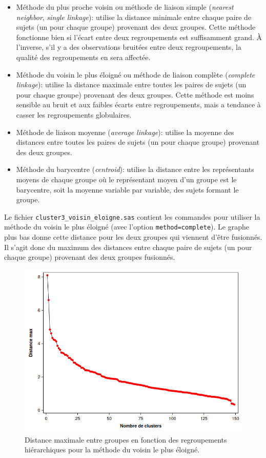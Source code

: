 \documentclass[
  11pt,
  letterpaper,
]{book}
\providecommand{\tightlist}{%
  \setlength{\itemsep}{0pt}\setlength{\parskip}{0pt}}
\theoremstyle{definition}
\theoremstyle{definition}
\theoremstyle{definition}
\theoremstyle{definition}
\theoremstyle{remark}
\begin{document}
\begin{itemize}
\tightlist
\item
  Méthode du plus proche voisin ou méthode de liaison simple (\emph{nearest neighbor}, \emph{single linkage}): utilise la distance minimale entre chaque paire de sujets (un pour chaque groupe) provenant des deux groupes. Cette méthode fonctionne bien si l'écart entre deux regroupements est suffisamment grand. À l'inverse, s'il y a des observations bruitées entre deux regroupements, la qualité des regroupements en sera affectée.
\item
  Méthode du voisin le plus éloigné ou méthode de liaison complète (\emph{complete linkage}): utilise la distance maximale entre toutes les paires de sujets (un pour chaque groupe) provenant des deux groupes. Cette méthode est moins sensible au bruit et aux faibles écarts entre regroupements, mais a tendance à casser les regroupements globulaires.
\item
  Méthode de liaison moyenne (\emph{average linkage}): utilise la moyenne des distances entre toutes les paires de sujets (un pour chaque groupe) provenant des deux groupes.
\item
  Méthode du barycentre (\emph{centroid}): utilise la distance entre les représentants moyens de chaque groupe où le représentant moyen d'un groupe est le barycentre, soit la moyenne variable par variable, des sujets formant le groupe.
\end{itemize}

Le fichier \texttt{cluster3\_voisin\_eloigne.sas} contient les commandes pour utiliser la méthode du voisin le plus éloigné (avec l'option \texttt{method=complete}). Le graphe plus bas donne cette distance pour les deux groupes qui viennent d'être fusionnés. Il s'agit donc du maximum des distances entre chaque paire de sujets (un pour chaque groupe) provenant des deux groupes fusionnés.

\begin{figure}

{\centering \includegraphics[width=0.8\linewidth]{figures/04-clustering-e21} 

}

\caption{Distance maximale entre groupes en fonction des regroupements hiérarchiques pour la méthode du voisin le plus éloigné.}\label{fig:fig4-e21}
\end{figure}
\end{document}
